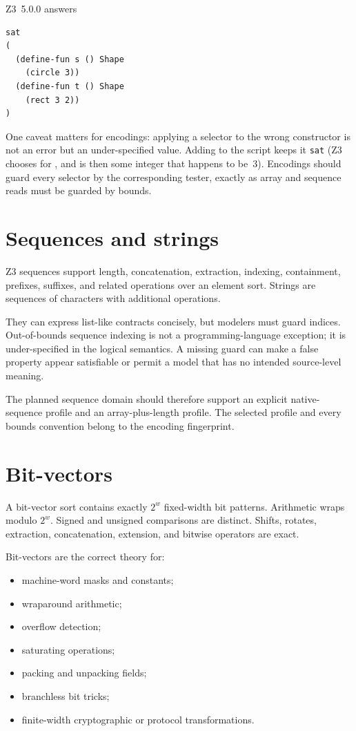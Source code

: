 \documentclass[10pt,letterpaper,oneside]{report}
\newcommand{\code}[1]{\texttt{\detokenize{#1}}}
\newcommand{\sat}{\texttt{sat}}
\begin{document}
Z3~5.0.0 answers

\begin{lstlisting}[language=SMTLib]
sat
(
  (define-fun s () Shape
    (circle 3))
  (define-fun t () Shape
    (rect 3 2))
)
\end{lstlisting}

One caveat matters for encodings: applying a selector to the wrong constructor is not an error but an under-specified value. Adding \code{(assert ((_ is rect) s))} to the script keeps it \sat{} (Z3 chooses \code{(rect 2 4)} for \code{s}, and \code{(radius s)} is then some integer that happens to be~$3$). Encodings should guard every selector by the corresponding tester, exactly as array and sequence reads must be guarded by bounds.


\section{Sequences and strings}

Z3 sequences support length, concatenation, extraction, indexing, containment, prefixes, suffixes, and related operations over an element sort. Strings are sequences of characters with additional operations.

They can express list-like contracts concisely, but modelers must guard indices. Out-of-bounds sequence indexing is not a programming-language exception; it is under-specified in the logical semantics. A missing guard can make a false property appear satisfiable or permit a model that has no intended source-level meaning.

The planned sequence domain should therefore support an explicit native-sequence profile and an array-plus-length profile. The selected profile and every bounds convention belong to the encoding fingerprint.

\section{Bit-vectors}

A bit-vector sort \code{(_ BitVec w)} contains exactly $2^w$ fixed-width bit patterns. Arithmetic wraps modulo $2^w$. Signed and unsigned comparisons are distinct. Shifts, rotates, extraction, concatenation, extension, and bitwise operators are exact.

Bit-vectors are the correct theory for:

\begin{itemize}
\item machine-word masks and constants;
\item wraparound arithmetic;
\item overflow detection;
\item saturating operations;
\item packing and unpacking fields;
\item branchless bit tricks;
\item finite-width cryptographic or protocol transformations.
\end{itemize}
\end{document}
